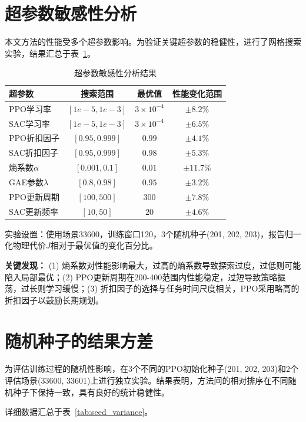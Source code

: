 \appendix
\section{超参数敏感性分析}

本文方法的性能受多个超参数影响。为验证关键超参数的稳健性，进行了网格搜索实验，结果汇总于表~\ref{tab:hyperparameter}。

\begin{table}[htbp]
\centering
\caption{超参数敏感性分析结果}
\label{tab:hyperparameter}
\begin{tabular}{lccc}
\toprule
超参数 & 搜索范围 & 最优值 & 性能变化范围 \\
\midrule
PPO学习率 & $[1e-5, 1e-3]$ & $3\times10^{-4}$ & $\pm8.2\%$ \\
SAC学习率 & $[1e-5, 1e-3]$ & $3\times10^{-4}$ & $\pm6.5\%$ \\
PPO折扣因子 & $[0.95, 0.999]$ & $0.99$ & $\pm4.1\%$ \\
SAC折扣因子 & $[0.95, 0.999]$ & $0.98$ & $\pm5.3\%$ \\
熵系数$\alpha$ & $[0.001, 0.1]$ & $0.01$ & $\pm11.7\%$ \\
GAE参数$\lambda$ & $[0.8, 0.98]$ & $0.95$ & $\pm3.2\%$ \\
PPO更新周期 & $[100, 500]$ & $300$ & $\pm7.8\%$ \\
SAC更新频率 & $[10, 50]$ & $20$ & $\pm4.6\%$ \\
\bottomrule
\end{tabular}
\end{table}

实验设置：使用场景33600，训练窗口120，3个随机种子(201, 202, 203)，报告归一化物理代价$J$相对于最优值的变化百分比。

\textbf{关键发现：} (1) 熵系数对性能影响最大，过高的熵系数导致探索过度，过低则可能陷入局部最优；(2) PPO更新周期在200-400范围内性能稳定，过短导致策略振荡，过长则学习缓慢；(3) 折扣因子的选择与任务时间尺度相关，PPO采用略高的折扣因子以鼓励长期规划。

\section{随机种子的结果方差}

为评估训练过程的随机性影响，在3个不同的PPO初始化种子(201, 202, 203)和2个评估场景(33600, 33601)上进行独立实验。结果表明，方法间的相对排序在不同随机种子下保持一致，具有良好的统计稳健性。

详细数据汇总于表~\ref{tab:seed_variance}。

